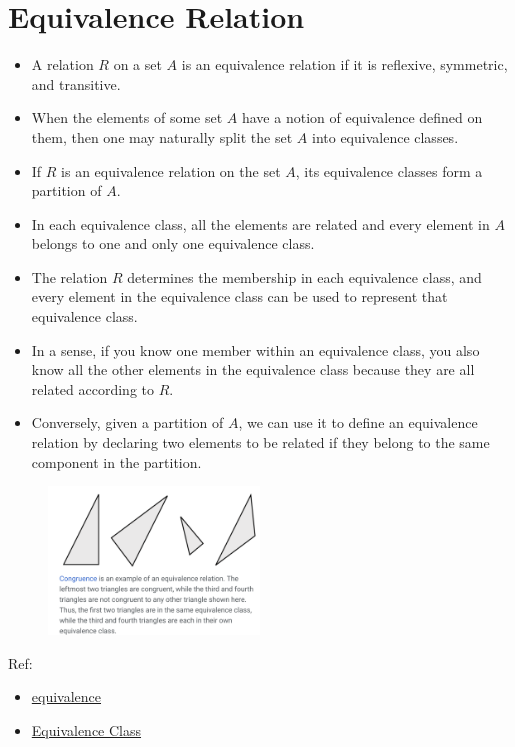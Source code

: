 \documentclass[en,hazy,blue,screen,14pt]{elegantnote}
\begin{document}
\section{Equivalence Relation}
\begin{itemize}
\item A relation $R$ on a set $A$ is an equivalence relation if it is 
reflexive, symmetric, and transitive.
\item When the elements of some set $A$ have a notion of equivalence defined on 
them, then one may naturally split the set $A$ into equivalence classes.
\item If $R$ is an equivalence relation on the set $A$, its equivalence classes 
form a partition of $A$.
\item In each equivalence class, all the elements are related and every element 
in $A$ belongs to one and only one equivalence class.
\item The relation $R$ determines the membership in each equivalence class, and 
every element in the equivalence class can be used to represent that equivalence 
class.
\item In a sense, if you know one member within an equivalence class, you also 
know all the other elements in the equivalence class because they are all 
related according to $R$.
\item Conversely, given a partition of $A$, we can use it to define 
an equivalence relation by declaring two elements to be related if they belong 
to the same component in the partition.
\end{itemize}
\begin{figure}[H]
\centering
\includegraphics[width=0.5\textwidth]{equ-class.png}
\end{figure}
Ref: 
\begin{itemize}
\item \href{
https://math.libretexts.org/Courses/Monroe_Community_College/MTH_220_Discrete_Ma
th/6\%3A_Relations/6.3\%3A_Equivalence_Relations_and_Partitions}{equivalence}
\item \href{https://en.wikipedia.org/wiki/Equivalence_class}{Equivalence Class}
\end{itemize}
\end{document}
